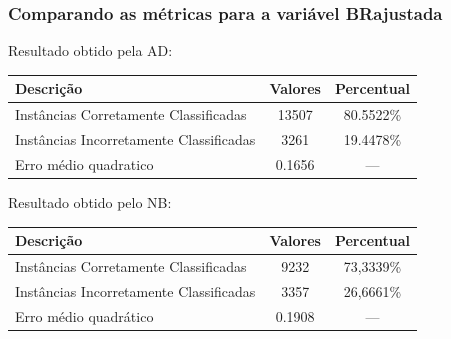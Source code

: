 \documentclass[11pt]{beamer}
\begin{document}
\begin{frame}\frametitle{Comparando as métricas para a variável BRajustada}
	Resultado obtido pela AD:
	\begin{table}[!ht]
		\centering
		\vspace{1mm}
		\begin{tabular}{l|c|c}
			\hline
			\textbf{Descrição} & \textbf{Valores} & \textbf{Percentual} \\
			\hline
			Instâncias Corretamente Classificadas & 13507 & 80.5522\% \\
			Instâncias Incorretamente Classificadas & 3261 & 19.4478\% \\
			Erro médio quadratico & 0.1656 & --- \\
		\end{tabular}
\pause
	\end{table}
	Resultado obtido pelo NB:
		\begin{table}[!ht]
			\centering
			\vspace{1mm}
			\begin{tabular}{l|c|c}
				\hline
				\textbf{Descrição} & \textbf{Valores} & \textbf{Percentual} \\
				\hline
				Instâncias Corretamente Classificadas & 9232 & 73,3339\% \\
				Instâncias Incorretamente Classificadas & 3357 & 26,6661\% \\
				Erro médio quadrático & 0.1908 & --- \\
			\end{tabular}
		\end{table}
\end{frame}
\end{document}
